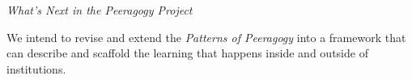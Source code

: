 \smallskip

\begin{framed}
\noindent 
\emph{What's Next in the Peeragogy Project}
\begin{collectinmacro}{\PeeragogyWN}{}{}
We intend to revise and extend the \emph{Patterns of Peeragogy} into a framework that can describe and scaffold the learning that happens inside and outside of institutions.
\end{collectinmacro}
\PeeragogyWN
\end{framed}

